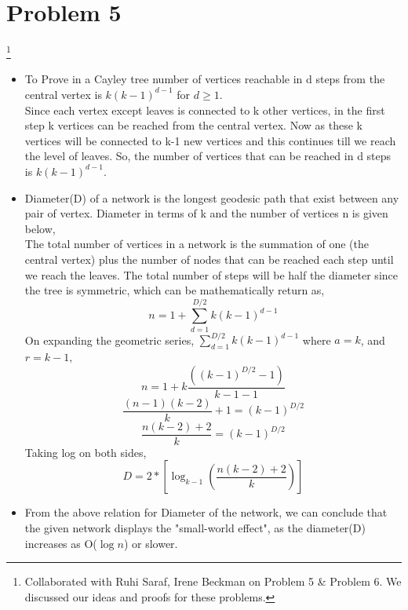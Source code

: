 \documentclass{article}
\newcommand\blfootnote[1]{%
  \begingroup
  \renewcommand\thefootnote{}\footnote{#1}%
  \addtocounter{footnote}{-1}%
  \endgroup
}
\begin{document}
\section*{Problem 5}
\blfootnote{Collaborated with Ruhi Saraf, Irene Beckman on Problem 5 \& Problem 6. We discussed our ideas and proofs for these problems.}
\begin{itemize}
\item
To Prove in a Cayley tree number of vertices reachable in d steps from the central vertex is $k(k - 1)^{d-1}$ for $d\geq1$.\\

Since each vertex except leaves is connected to k other vertices, in the first step k vertices can be reached from the central vertex. Now as these k vertices will be connected to k-1 new vertices and this continues till we reach the level of leaves.              So, the number of vertices that can be reached in d steps is $k(k-1)^{d-1}$.

\item
Diameter(D) of a network is the longest geodesic path that exist between any pair of  vertex. Diameter in terms of k and the number of vertices n is given below,$ $  \\

The total number of vertices in a network is the summation of one (the central vertex) plus the number of nodes that can be reached each step until we reach the leaves. 
The total number of steps will be half the diameter since the tree is symmetric, which can be mathematically return as,
$$ n = 1 + \sum_{d=1}^{D/2} k(k-1)^{d-1} $$
On expanding the geometric series, $\sum_{d=1}^{D/2} k(k-1)^{d-1}$ where $a = k$, and $r = k-1,$ 
$$ n = 1 + k\dfrac{((k-1)^{D/2} - 1)}{k-1 -1}$$
$$ \dfrac{(n -1) (k-2)}{k} + 1 = (k-1)^{D/2}$$
$$ \dfrac{n(k-2) + 2}{k} = (k-1)^{D/2} $$
Taking log on both sides,
$$ D = 2 * [\log_{k-1}({\dfrac{n(k-2) + 2}{k}})] $$

\item
From the above relation for Diameter of the network, we can conclude that the given network displays the "small-world effect", as the diameter(D) increases as O($\log{n}$) or slower.
\end{itemize}
\end{document}
